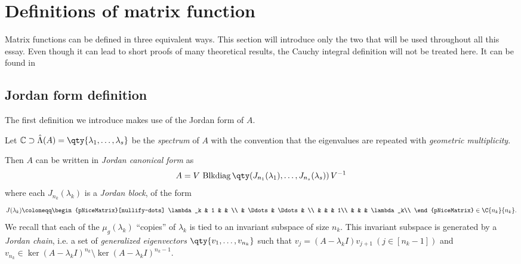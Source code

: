 \section{Definitions of matrix function}\label{sect:matfun_defs}
Matrix functions can be defined in three equivalent ways. This section will introduce only the two that will be used throughout all this essay. Even though it can lead to short proofs of many theoretical results, the Cauchy integral definition will not be treated here. It can be found in~\cite[§~1.2.3]{higham:matfun_book} 

\subsection*{Jordan form definition}
The first definition we introduce makes use of the Jordan form of $A$.

\begin{notazione*}
	Let $\mathbb{C}\supset\hat{\Lambda}(A)=\qty{\lambda_1,\dots,\lambda_s}$ be the \emph{spectrum} of $A$ with the convention that the eigenvalues are repeated with \emph{geometric multiplicity}. 
\end{notazione*}
Then $A$ can be written in \emph{Jordan canonical form} as
\begin{equation}\label{eqn:jordan_A}
	A = V\,\operatorname{Blkdiag}\qty(J_{n_1}(\lambda_1),\dots,J_{n_s}(\lambda_s))\,V^{-1}
\end{equation}
where each $J_{n_k}(\lambda_k)$ is a \emph{Jordan block}, of the form 
\[
	J(\lambda_k)\coloneqq
	\begin{pNiceMatrix}[nullify-dots]
		\lambda_k & 1      &        & \\
		& \Ddots & \Ddots & \\
		&        &        & 1\\
		&        &        & \lambda_k\\                    
	\end{pNiceMatrix}\in\C{n_k}{n_k}.
\]
We recall that each of the $\mu_g(\lambda_k)$ ``copies'' of $\lambda_k$ is tied to an invariant subspace of size $n_k$. This invariant subspace is generated by a \emph{Jordan chain}, i.e. a set of \emph{generalized eigenvectors} $\qty{v_1,\dots,v_{n_k}}$ such that $v_j=(A-\lambda_kI)v_{j+1}\ (j\in[n_k-1])$ and $v_{n_k}\in\ker(A-\lambda_kI)^{n_k}\setminus\ker(A-\lambda_kI)^{n_k-1}$. 

